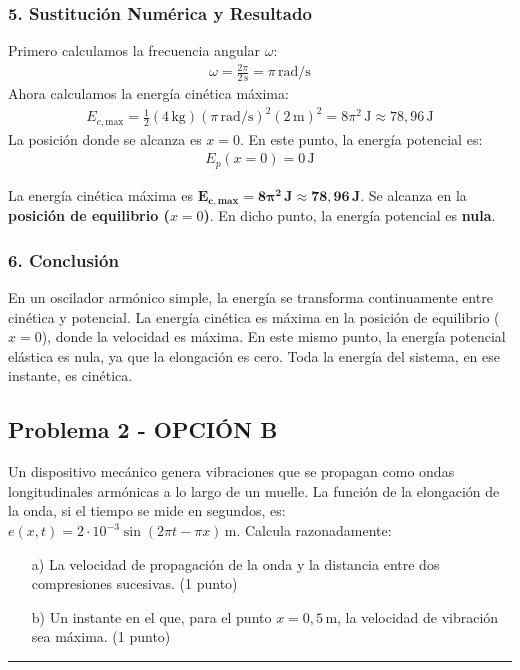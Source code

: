 \subsubsection*{5. Sustitución Numérica y Resultado}
Primero calculamos la frecuencia angular $\omega$:
\begin{gather}
    \omega = \frac{2\pi}{2\,\text{s}} = \pi\,\text{rad/s}
\end{gather}
Ahora calculamos la energía cinética máxima:
\begin{gather}
    E_{c, \text{max}} = \frac{1}{2}(4\,\text{kg})(\pi\,\text{rad/s})^2(2\,\text{m})^2 = 8\pi^2\,\text{J} \approx 78,96\,\text{J}
\end{gather}
La posición donde se alcanza es $x=0$. En este punto, la energía potencial es:
\begin{gather}
    E_{p}(x=0) = 0\,\text{J}
\end{gather}
\begin{cajaresultado}
La energía cinética máxima es $\boldsymbol{E_{c, \text{max}} = 8\pi^2\,\textbf{J} \approx 78,96\,\textbf{J}}$.
Se alcanza en la \textbf{posición de equilibrio ($x=0$)}. En dicho punto, la energía potencial es \textbf{nula}.
\end{cajaresultado}

\subsubsection*{6. Conclusión}
\begin{cajaconclusion}
En un oscilador armónico simple, la energía se transforma continuamente entre cinética y potencial. La energía cinética es máxima en la posición de equilibrio ($x=0$), donde la velocidad es máxima. En este mismo punto, la energía potencial elástica es nula, ya que la elongación es cero. Toda la energía del sistema, en ese instante, es cinética.
\end{cajaconclusion}

\newpage
\subsection{Problema 2 - OPCIÓN B}
\label{subsec:2B_2016_jul_ext}
\begin{cajaenunciado}
Un dispositivo mecánico genera vibraciones que se propagan como ondas longitudinales armónicas a lo largo de un muelle. La función de la elongación de la onda, si el tiempo se mide en segundos, es: $e(x,t)=2\cdot10^{-3}\sin(2\pi t-\pi x)\,\text{m}$. Calcula razonadamente:
\begin{enumerate}
    \item[a)] La velocidad de propagación de la onda y la distancia entre dos compresiones sucesivas. (1 punto)
    \item[b)] Un instante en el que, para el punto $x=0,5\,\text{m}$, la velocidad de vibración sea máxima. (1 punto)
\end{enumerate}
\end{cajaenunciado}
\hrule

